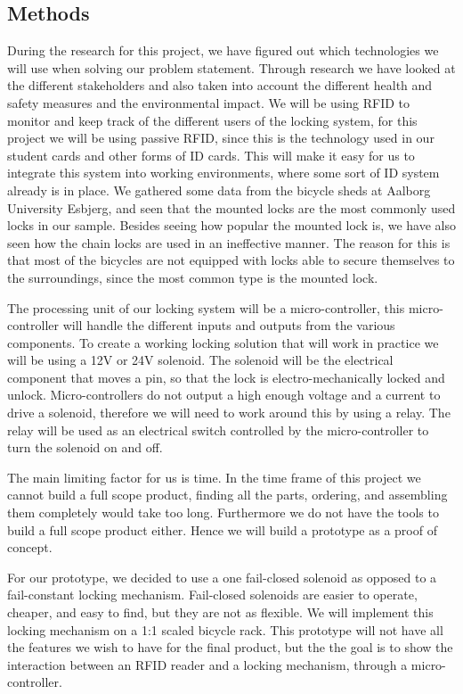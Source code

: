 \documentclass[twoside]{article}
\begin{document}
\begin{multicols}{2}

\section{Methods}

During the research for this project, we have figured out which technologies we will use when solving our problem statement. Through research we have looked at the different stakeholders and also taken into account the different health and safety measures and the environmental impact.
We will be using RFID to monitor and keep track of the different users of the locking system, for this project we will be using passive RFID, since this is the technology used in our student cards and other forms of ID cards. This will make it easy for us to integrate this system into working environments, where some sort of ID system already is in place. 
We gathered some data from the bicycle sheds at Aalborg University Esbjerg, and seen that the mounted locks are the most commonly used locks in our sample. Besides seeing how popular the mounted lock is, we have also seen how the chain locks are used in an ineffective manner. The reason for this is that most of the bicycles are not equipped with locks able to secure themselves to the surroundings, since the most common type is the mounted lock.

The processing unit of our locking system will be a micro-controller, this micro-controller will handle the different inputs and outputs from the various components.
To create a working locking solution that will work in practice we will be using a 12V or 24V solenoid. The solenoid will be the electrical component that moves a pin, so that the lock is electro-mechanically locked and unlock. 
Micro-controllers do not output a high enough voltage and a current to drive a solenoid, therefore we will need to work around this by using a relay. The relay will be used as an electrical switch controlled by the micro-controller to turn the solenoid on and off.

The main limiting factor for us is time. In the time frame of this project we cannot build a full scope product, finding all the parts, ordering, and assembling them completely would take too long. Furthermore we do not have the tools to build a full scope product either. Hence we will build a prototype as a proof of concept.


For our prototype, we decided to use a one fail-closed solenoid as opposed to a fail-constant locking mechanism. Fail-closed solenoids are easier to operate, cheaper, and easy to find, but they are not as flexible. We will implement this locking mechanism on a 1:1 scaled bicycle rack.
This prototype will not have all the features we wish to have for the final product, but the the goal is to show the interaction between an RFID reader and a locking mechanism, through a micro-controller.



\end{multicols}
\end{document}
